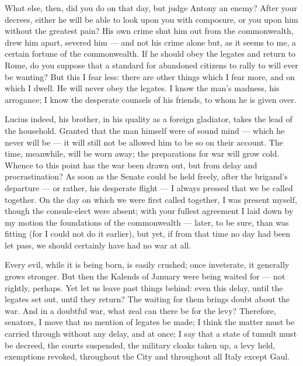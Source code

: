  What else, then, did you do on that day, but judge Antony an enemy? After your decrees, either he will be able to look upon you with composure, or you upon him without the greatest pain? His own crime shut him out from the commonwealth, drew him apart, severed him --- and not his crime alone but, as it seems to me, a certain fortune of the commonwealth. If he should obey the legates and return to Rome, do you suppose that a standard for abandoned citizens to rally to will ever be wanting? But this I fear less: there are other things which I fear more, and on which I dwell. He will never obey the legates. I know the man's madness, his arrogance; I know the desperate counsels of his friends, to whom he is given over.

 Lucius indeed, his brother, in his quality as a foreign gladiator, takes the lead of the household. Granted that the man himself were of sound mind --- which he never will be --- it will still not be allowed him to be so on their account. The time, meanwhile, will be worn away; the preparations for war will grow cold. Whence to this point has the war been drawn out, but from delay and procrastination? As soon as the Senate could be held freely, after the brigand's departure --- or rather, his desperate flight --- I always pressed that we be called together. On the day on which we were first called together, I was present myself, though the consuls-elect were absent; with your fullest agreement I laid down by my motion the foundations of the commonwealth --- later, to be sure, than was fitting (for I could not do it earlier), but yet, if from that time no day had been let pass, we should certainly have had no war at all.

 Every evil, while it is being born, is easily crushed; once inveterate, it generally grows stronger. But then the Kalends of January were being waited for --- not rightly, perhaps. Yet let us leave past things behind: even this delay, until the legates set out, until they return? The waiting for them brings doubt about the war. And in a doubtful war, what zeal can there be for the levy? Therefore, senators, I move that no mention of legates be made; I think the matter must be carried through without any delay, and at once; I say that a state of tumult must be decreed, the courts suspended, the military cloaks taken up, a levy held, exemptions revoked, throughout the City and throughout all Italy except Gaul.

